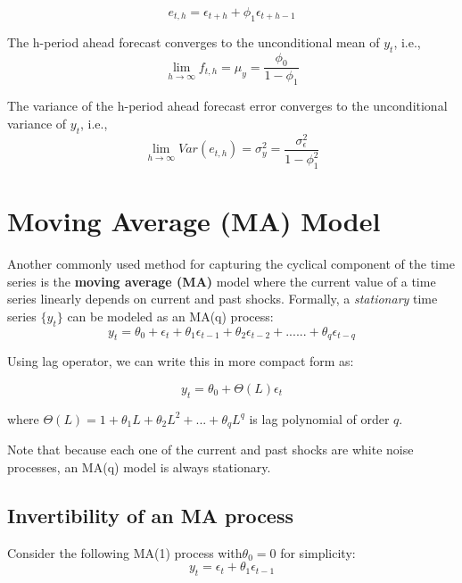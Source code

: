 \documentclass[]{book}
\theoremstyle{definition}
\theoremstyle{definition}
\theoremstyle{definition}
\theoremstyle{remark}
\let\BeginKnitrBlock\begin \let\EndKnitrBlock\end
\begin{document}
\[e_{t,h}=\epsilon_{t+h} + \phi_1 \epsilon_{t+h-1}\]

\BeginKnitrBlock{theorem}
\protect\hypertarget{thm:unnamed-chunk-6}{}{\label{thm:unnamed-chunk-6} }The
h-period ahead forecast converges to the unconditional mean of \(y_t\),
i.e., \[\lim_{h\to\infty} f_{t,h}=\mu_y=\frac{\phi_0}{1-\phi_1}\]
\EndKnitrBlock{theorem}

\BeginKnitrBlock{theorem}
\protect\hypertarget{thm:unnamed-chunk-7}{}{\label{thm:unnamed-chunk-7} }The
variance of the h-period ahead forecast error converges to the
unconditional variance of \(y_t\), i.e.,
\[\lim_{h\to\infty} Var(e_{t,h})=\sigma^2_y=\frac{\sigma^2_\epsilon}{1-\phi_1^2}\]
\EndKnitrBlock{theorem}

\hypertarget{moving-average-ma-model}{%
\section{Moving Average (MA) Model}\label{moving-average-ma-model}}

Another commonly used method for capturing the cyclical component of the
time series is the \textbf{moving average (MA)} model where the current
value of a time series linearly depends on current and past shocks.
Formally, a \emph{stationary} time series \(\{y_t\}\) can be modeled as
an MA(q) process: \begin{equation}
  y_t = \theta_0 + \epsilon_t + \theta_1 \epsilon_{t-1} + \theta_2 \epsilon_{t-2} + ...... + \theta_q \epsilon_{t-q}
    \end{equation}

Using lag operator, we can write this in more compact form as:

\[y_t = \theta_0 +\Theta(L) \epsilon_t\]

where \(\Theta(L)=1+\theta_1 L+ \theta_2 L^2+...+\theta_q L^q\) is lag
polynomial of order \(q\).

Note that because each one of the current and past shocks are white
noise processes, an MA(q) model is always stationary.

\hypertarget{invertibility-of-an-ma-process}{%
\subsection{Invertibility of an MA
process}\label{invertibility-of-an-ma-process}}

Consider the following MA(1) process with\(\theta_0=0\) for simplicity:
\[y_t=\epsilon_t +\theta_1 \epsilon_{t-1}\]
\end{document}
